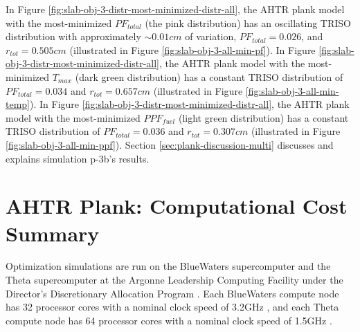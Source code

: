 In Figure \ref{fig:slab-obj-3-distr-most-minimized-distr-all}, the \gls{AHTR} plank model 
with the most-minimized $PF_{total}$ (the pink distribution) has an oscillating TRISO 
distribution with approximately $\sim0.01cm$ of variation, $PF_{total} = 0.026$, and 
$r_{tot}=0.505cm$ (illustrated in Figure \ref{fig:slab-obj-3-all-min-pf}).
In Figure \ref{fig:slab-obj-3-distr-most-minimized-distr-all}, the \gls{AHTR} plank 
model with the most-minimized $T_{max}$ (dark green distribution) has a constant TRISO 
distribution of $PF_{total}=0.034$ and $r_{tot}=0.657cm$
(illustrated in Figure \ref{fig:slab-obj-3-all-min-temp}).
In Figure \ref{fig:slab-obj-3-distr-most-minimized-distr-all}, the \gls{AHTR} plank 
model with the most-minimized $PPF_{fuel}$ (light green distribution) has a constant 
TRISO distribution of $PF_{total} = 0.036$ and $r_{tot}=0.307cm$
(illustrated in Figure \ref{fig:slab-obj-3-all-min-ppf}).
Section \ref{sec:plank-discussion-multi} discusses and explains simulation p-3b's 
results.

\section{AHTR Plank: Computational Cost Summary}
\label{sec:plank-compute-cost}
Optimization simulations are run on the BlueWaters supercomputer \cite{ncsa_about_2017} and
the Theta supercomputer at the Argonne Leadership Computing Facility under the Director's 
Discretionary Allocation Program \cite{noauthor_argonne_2022}. 
Each BlueWaters compute node has 32 processor cores with a nominal clock speed of 3.2GHz
\cite{ncsa_about_2017}, and each Theta compute node has 64 processor cores with a nominal 
clock speed of 1.5GHz \cite{noauthor_argonne_2022}.  

